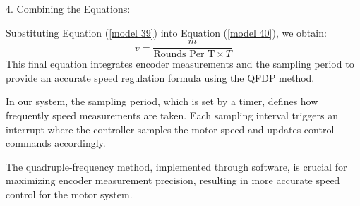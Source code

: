 \documentclass[journal,onecolumn]{IEEEtran}
\begin{document}
4. Combining the Equations:

   Substituting Equation (\ref{model 39}) into Equation (\ref{model 40}), we obtain:
   \begin{equation}
       \label{model 40}
       v = \frac{m}{\text{Rounds Per T} \times T}
   \end{equation}
   This final equation integrates encoder measurements and the sampling period to provide an accurate speed regulation formula using the QFDP method.

In our system, the sampling period, which is set by a timer, defines how frequently speed measurements are taken. Each sampling interval triggers an interrupt where the controller samples the motor speed and updates control commands accordingly.

The quadruple-frequency method, implemented through software, is crucial for maximizing encoder measurement precision, resulting in more accurate speed control for the motor system.




\end{document}
